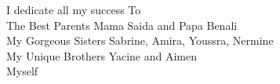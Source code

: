 \begin{center}
\begin{LARGE}
\vspace*{\fill}
I dedicate all my success To \\
The Best Parents Mama Saida and Papa Benali  \\
My Gorgeous Sisters Sabrine, Amira, Youssra, Nermine\\
My Unique Brothers Yacine and Aimen\\
Myself\\
\vspace*{\fill}
\end{LARGE}
\end{center}
